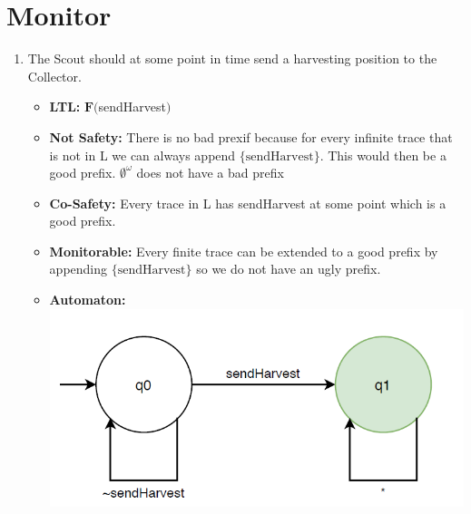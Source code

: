 \documentclass[12pt]{article}
\begin{document}
\lstset{language=C++}

\section*{Monitor}
\begin{enumerate}
	\item The Scout should at some point in time send a harvesting
position to the Collector.
	\begin{itemize}
		\item \textbf{LTL:} $\mathbf{F}($sendHarvest$)$
		\item \textbf{Not Safety:} There is no bad prexif because for every infinite trace that is not in L we can always append $\{\text{sendHarvest}\}$. This would then be a good prefix. $\emptyset ^{\omega}$ does not have a bad prefix
		\item \textbf{Co-Safety:} Every trace in L has sendHarvest at some point which is a good prefix.
		\item \textbf{Monitorable:} Every finite trace can be extended to a good prefix by appending $\{\text{sendHarvest}\}$ so we do not have an ugly prefix.
		\item \textbf{Automaton:}\\
			\includegraphics[scale = 0.5]{images/sendHarvestAutomaton}	
		\end{itemize}


\end{enumerate}
\end{document}
